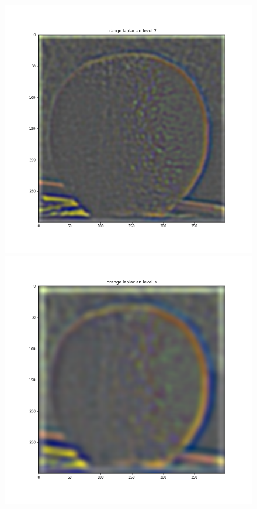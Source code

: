 \documentclass{article}
\begin{document}
\begin{figure}[!htb]
\endminipage
{}
    \includegraphics[width=\linewidth]{orange laplacian level 2.png}
\endminipage
{}
    \includegraphics[width=\linewidth]{orange laplacian level 3.png}

\end{figure}
\end{document}
